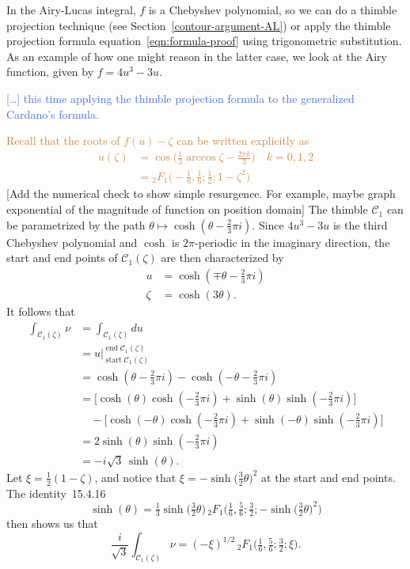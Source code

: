 \documentclass{article}
\theoremstyle{definition}
\theoremstyle{plain}
\newenvironment{todo}{\color{Coral}}{\color{black}}
\newenvironment{old}{\color{RoyalBlue}}{\color{black}}
\begin{document}
\begin{old}\par
In the Airy-Lucas integral, $f$ is a Chebyshev polynomial, so we can do a thimble projection technique (see Section~\ref{contour-argument-AL}) or apply the thimble projection formula equation~\eqref{eqn:formula-proof} using trigonometric substitution. As an example of how one might reason in the latter case, we look at the Airy function, given by $f = 4u^3-3u$.

\textcolor{RoyalBlue}{[\ldots] this time applying the thimble projection formula to the generalized Cardano's formula.}

\textcolor{Peru}{Recall that the roots of $f(u)-\zeta$ can be written explicitly as 
\begin{align*}
    u(\zeta)&=\cos\Big(\frac{1}{3}\arccos\zeta-\frac{2\pi k}{3}\Big) \quad k=0,1,2\\
    &={}_2F_1\Big(-\frac{1}{6},\frac{1}{6};\frac{1}{2};1-\zeta^2\Big)
\end{align*}}
\begin{todo}[Add the numerical check to show simple resurgence. For example, maybe graph exponential of the magnitude of function on position domain]\end{todo}
The thimble $\mathcal{C}_1$ can be parametrized by the path $\theta \mapsto \cosh(\theta - \tfrac{2}{3}\pi i)$. Since $4u^3 - 3u$ is the third Chebyshev polynomial and $\cosh$ is $2\pi$-periodic in the imaginary direction, the start and end points of $\mathcal{C}_1(\zeta)$ are then characterized by
\begin{align*}
u & = \cosh(\mp\theta - \tfrac{2}{3}\pi i) \\
\zeta & = \cosh(3\theta).
\end{align*}
It follows that
\begin{align*}
\int_{\mathcal{C}_1(\zeta)} \nu & = \int_{\mathcal{C}_1(\zeta)} du \\
& = u \Big|_{\operatorname{start} \mathcal{C}_1(\zeta)}^{\operatorname{end} \mathcal{C}_1(\zeta)}\\
 & = \cosh(\theta - \tfrac{2}{3}\pi i) - \cosh(-\theta - \tfrac{2}{3}\pi i) \\
& = \big[\cosh(\theta) \cosh(-\tfrac{2}{3}\pi i) + \sinh(\theta) \sinh(-\tfrac{2}{3}\pi i)\big] \\
& \quad - \big[\cosh(-\theta) \cosh(-\tfrac{2}{3}\pi i) + \sinh(-\theta) \sinh(-\tfrac{2}{3}\pi i)\big] \\
& = 2\sinh(\theta) \sinh(-\tfrac{2}{3}\pi i) \\
& = -i\sqrt{3}\,\sinh(\theta).
\end{align*}
Let $\xi = \tfrac{1}{2}(1 - \zeta)$, and notice that $\xi = -\sinh\big(\tfrac{3}{2} \theta\big)^2$ at the start and end points. The identity~15.4.16 \cite{dlmf}
\[ \sinh( \theta) = \tfrac{1}{3} \sinh\big( \tfrac{3}{2}\theta\big)\,{}_2F_1\big(\tfrac{1}{6}, \tfrac{5}{6}; \tfrac{3}{2}; -\sinh\big(\tfrac{3}{2}\theta\big)^2\big) \]
then shows us that
\[ \frac{i}{\sqrt{3}} \int_{\mathcal{C}_1(\zeta)} \nu = (-\xi)^{1/2}\,{}_2F_1\big(\tfrac{1}{6}, \tfrac{5}{6}; \tfrac{3}{2}; \xi\big). \]


\end{old}
\end{document}
